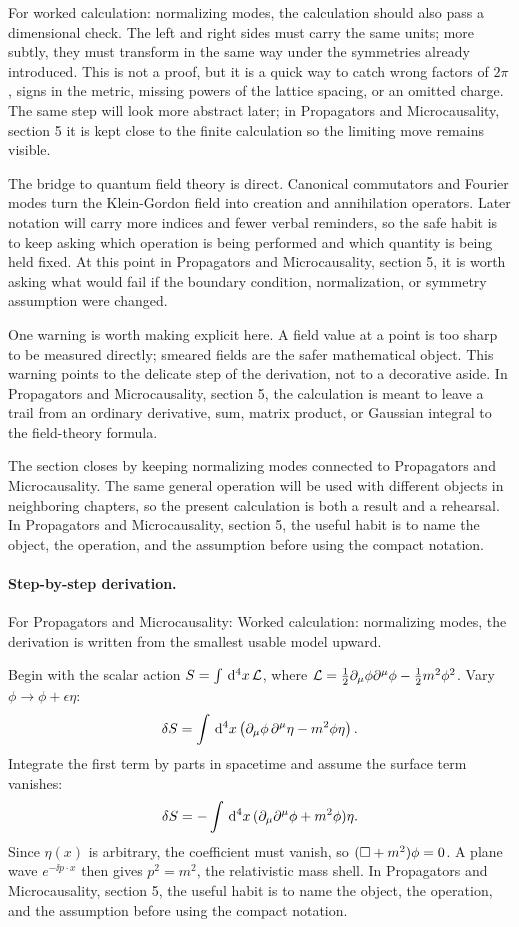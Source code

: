 For worked calculation: normalizing modes, the calculation should also pass a dimensional check.  The left and right sides must carry the same units; more subtly, they must transform in the same way under the symmetries already introduced.  This is not a proof, but it is a quick way to catch wrong factors of \(2\pi\), signs in the metric, missing powers of the lattice spacing, or an omitted charge.  The same step will look more abstract later; in Propagators and Microcausality, section 5 it is kept close to the finite calculation so the limiting move remains visible.

The bridge to quantum field theory is direct.  Canonical commutators and Fourier modes turn the Klein-Gordon field into creation and annihilation operators.  Later notation will carry more indices and fewer verbal reminders, so the safe habit is to keep asking which operation is being performed and which quantity is being held fixed.  At this point in Propagators and Microcausality, section 5, it is worth asking what would fail if the boundary condition, normalization, or symmetry assumption were changed.

One warning is worth making explicit here.  A field value at a point is too sharp to be measured directly; smeared fields are the safer mathematical object.  This warning points to the delicate step of the derivation, not to a decorative aside.  In Propagators and Microcausality, section 5, the calculation is meant to leave a trail from an ordinary derivative, sum, matrix product, or Gaussian integral to the field-theory formula.

The section closes by keeping normalizing modes connected to Propagators and Microcausality.  The same general operation will be used with different objects in neighboring chapters, so the present calculation is both a result and a rehearsal.  In Propagators and Microcausality, section 5, the useful habit is to name the object, the operation, and the assumption before using the compact notation.



\paragraph{Step-by-step derivation.}

For Propagators and Microcausality: Worked calculation: normalizing modes, the derivation is written from the smallest usable model upward.

Begin with the scalar action \(S=\int\,\mathrm d^4x\,\mathcal L\), where \(\mathcal L=\frac12\partial_\mu\phi\partial^\mu\phi-\frac12m^2\phi^2\).  Vary \(\phi\to\phi+\epsilon\eta\):
\[
  \delta S=\int\,\mathrm d^4x\left(\partial_\mu\phi\,\partial^\mu\eta-m^2\phi\eta\right).
\]
Integrate the first term by parts in spacetime and assume the surface term vanishes:
\[
  \delta S=-\int\,\mathrm d^4x\,(\partial_\mu\partial^\mu\phi+m^2\phi)\eta.
\]
Since \(\eta(x)\) is arbitrary, the coefficient must vanish, so \((\Box+m^2)\phi=0\).  A plane wave \(e^{-\ii p\cdot x}\) then gives \(p^2=m^2\), the relativistic mass shell.  In Propagators and Microcausality, section 5, the useful habit is to name the object, the operation, and the assumption before using the compact notation.

